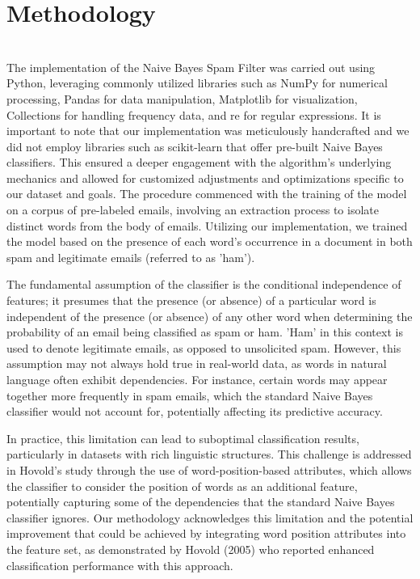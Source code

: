 \documentclass{acm_proc_article-sp}
\begin{document}
\section{Methodology}~\\
The implementation of the Naive Bayes Spam Filter was carried out using Python, leveraging commonly utilized libraries such as NumPy for numerical processing, Pandas for data manipulation, Matplotlib for visualization, Collections for handling frequency data, and re for regular expressions. It is important to note that our implementation was meticulously handcrafted and we did not employ libraries such as scikit-learn that offer pre-built Naive Bayes classifiers. This ensured a deeper engagement with the algorithm's underlying mechanics and allowed for customized adjustments and optimizations specific to our dataset and goals. The procedure commenced with the training of the model on a corpus of pre-labeled emails, involving an extraction process to isolate distinct words from the body of emails. Utilizing our implementation, we trained the model based on the presence of each word's occurrence in a document in both spam and legitimate emails (referred to as 'ham').

The fundamental assumption of the classifier is the conditional independence of features; it presumes that the presence (or absence) of a particular word is independent of the presence (or absence) of any other word when determining the probability of an email being classified as spam or ham. 'Ham' in this context is used to denote legitimate emails, as opposed to unsolicited spam. However, this assumption may not always hold true in real-world data, as words in natural language often exhibit dependencies. For instance, certain words may appear together more frequently in spam emails, which the standard Naive Bayes classifier would not account for, potentially affecting its predictive accuracy.

In practice, this limitation can lead to suboptimal classification results, particularly in datasets with rich linguistic structures. This challenge is addressed in Hovold's study through the use of word-position-based attributes, which allows the classifier to consider the position of words as an additional feature, potentially capturing some of the dependencies that the standard Naive Bayes classifier ignores. Our methodology acknowledges this limitation and the potential improvement that could be achieved by integrating word position attributes into the feature set, as demonstrated by Hovold (2005) who reported enhanced classification performance with this approach.
\end{document}
